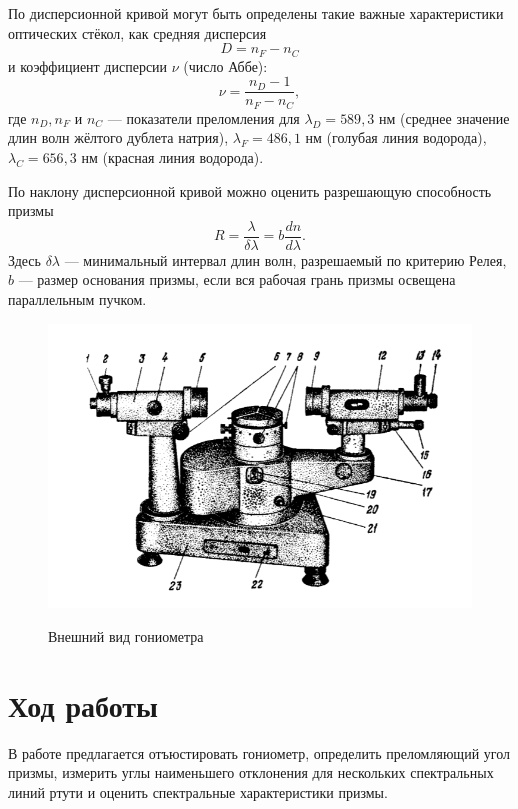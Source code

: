 	По дисперсионной кривой могут быть определены такие важные характеристики оптических стёкол, как средняя дисперсия
	\begin{equation}
	D = n_F - n_C
	\end{equation}
	и коэффициент дисперсии $\nu$ (число Аббе):
	\begin{equation}
	\nu = \dfrac{n_D - 1}{n_F - n_C},
	\end{equation}
	где $n_D, n_F$ и $n_C$ --- показатели преломления для $\lambda_D = 589{,}3$ нм (среднее значение длин волн жёлтого дублета натрия), $\lambda_F = 486{,}1$ нм (голубая линия водорода), $\lambda_C = 656{,}3$ нм (красная линия водорода).
	
	По наклону дисперсионной кривой можно оценить разрешающую
	способность призмы
	\begin{equation}
	R = \dfrac{\lambda}{\delta\lambda} = b\dfrac{dn}{d\lambda}.
	\end{equation}
	Здесь $\delta\lambda$ --- минимальный интервал длин волн, разрешаемый по критерию Релея, $b$ --- размер основания призмы, если вся рабочая грань призмы освещена параллельным пучком.
	
  \begin{figure}[h]
    \centering
    \includegraphics[width=0.5\linewidth]{gan.png}
    \label{fig:gan} 
    \caption{Внешний вид гониометра}
  \end{figure}


\newpage
\section{Ход работы}
	В работе предлагается отъюстировать гониометр, определить преломляющий угол призмы, измерить углы наименьшего отклонения для нескольких спектральных линий ртути и оценить спектральные характеристики призмы.
